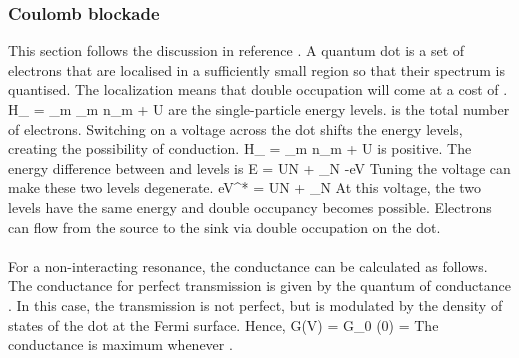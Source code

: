 \documentclass[14pt]{extarticle}
\numberwithin{equation}{section}
\begin{document}
\subsubsection{Coulomb blockade}
This section follows the discussion in reference \cite{piers}. A quantum dot is a set of electrons that are localised in a sufficiently small region so that their spectrum is quantised.
The localization means that double occupation will come at a cost of .
\beq
H_ = \sum_{m\sigma} \epsilon_m n_{m\sigma} + U
\eeq
{} are the single-particle energy levels.
 is the total number of electrons.
 Switching on a voltage  across the dot shifts the energy levels, creating the possibility of conduction.
\beq
H_ = \sum_{m\sigma}  n_{m\sigma} + U
\eeq
{} is positive.
The energy difference between  and  levels is
\beq
\Delta E = UN + \epsilon_{N} -eV
\eeq
Tuning the voltage can make these two levels degenerate.
\beq
eV^* = UN + \epsilon_{N}
\eeq
At this voltage, the two levels have the same energy and double occupancy becomes possible.
Electrons can flow from the source to the sink via double occupation on the dot.\\\\
For a non-interacting resonance, the conductance can be calculated as follows.
The conductance for perfect transmission is given by the quantum of conductance .
In this case, the transmission is not perfect, but is modulated by the density of states of the dot at the Fermi surface.
Hence,
\beq
G(V) = G_0 \rho(0) =  
\eeq
The conductance is maximum whenever .
\end{document}
